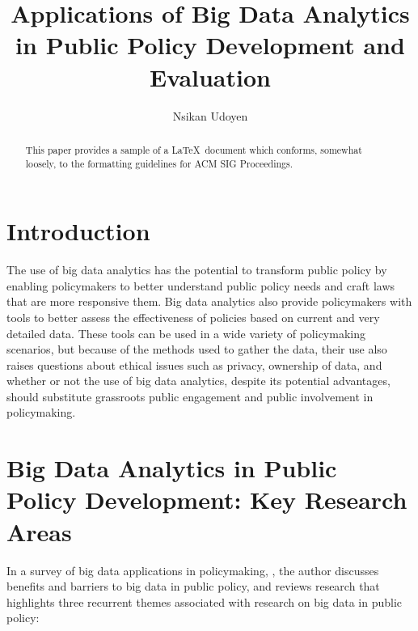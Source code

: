 \documentclass[sigconf]{acmart}
\begin{document}
\title{Applications of Big Data Analytics in Public Policy Development and Evaluation}


\author{Nsikan Udoyen}
\orcid{}


\renewcommand{\shortauthors}{N. Udoyen}


\begin{abstract}
This paper provides a sample of a \LaTeX\ document which conforms,
somewhat loosely, to the formatting guidelines for
ACM SIG Proceedings.
\end{abstract}



\maketitle



\section{Introduction}

The use of big data analytics has the potential to transform public policy by enabling policymakers to better understand public policy needs and craft laws that are more responsive them. Big data analytics also provide policymakers with tools to better assess the effectiveness of policies based on current and very detailed data. These tools can be used in a wide variety of policymaking scenarios, but because of the methods used to gather the data, their use also raises questions about ethical issues such as privacy, ownership of data, and whether or not the use of big data analytics, despite its potential advantages, should substitute grassroots public engagement and public involvement in policymaking.

\section{Big Data Analytics in Public Policy Development: Key Research Areas}
In a survey of big data applications in policymaking, \cite{giest_2017}, the author discusses benefits and barriers to big data in public policy, and reviews research that highlights three recurrent themes associated with research on big data in public policy:
\end{document}
